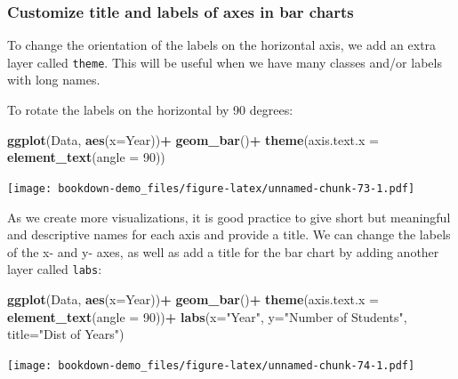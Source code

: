 \documentclass[
]{book}
\newenvironment{Shaded}{\begin{snugshade}}{\end{snugshade}}
\newcommand{\AttributeTok}[1]{\textcolor[rgb]{0.13,0.29,0.53}{#1}}
\newcommand{\DecValTok}[1]{\textcolor[rgb]{0.00,0.00,0.81}{#1}}
\newcommand{\FunctionTok}[1]{\textcolor[rgb]{0.13,0.29,0.53}{\textbf{#1}}}
\newcommand{\NormalTok}[1]{#1}
\newcommand{\SpecialCharTok}[1]{\textcolor[rgb]{0.81,0.36,0.00}{\textbf{#1}}}
\newcommand{\StringTok}[1]{\textcolor[rgb]{0.31,0.60,0.02}{#1}}
\begin{document}
\hypertarget{customize-title-and-labels-of-axes-in-bar-charts}{%
\subsubsection{Customize title and labels of axes in bar charts}\label{customize-title-and-labels-of-axes-in-bar-charts}}

To change the orientation of the labels on the horizontal axis, we add an extra layer called \texttt{theme}. This will be useful when we have many classes and/or labels with long names.

To rotate the labels on the horizontal by 90 degrees:

\begin{Shaded}
\begin{Highlighting}[]
\FunctionTok{ggplot}\NormalTok{(Data, }\FunctionTok{aes}\NormalTok{(}\AttributeTok{x=}\NormalTok{Year))}\SpecialCharTok{+}
  \FunctionTok{geom\_bar}\NormalTok{()}\SpecialCharTok{+}
  \FunctionTok{theme}\NormalTok{(}\AttributeTok{axis.text.x =} \FunctionTok{element\_text}\NormalTok{(}\AttributeTok{angle =} \DecValTok{90}\NormalTok{))}
\end{Highlighting}
\end{Shaded}

\texttt{[image: bookdown-demo\_files/figure-latex/unnamed-chunk-73-1.pdf]}

As we create more visualizations, it is good practice to give short but meaningful and descriptive names for each axis and provide a title. We can change the labels of the x- and y- axes, as well as add a title for the bar chart by adding another layer called \texttt{labs}:

\begin{Shaded}
\begin{Highlighting}[]
\FunctionTok{ggplot}\NormalTok{(Data, }\FunctionTok{aes}\NormalTok{(}\AttributeTok{x=}\NormalTok{Year))}\SpecialCharTok{+}
  \FunctionTok{geom\_bar}\NormalTok{()}\SpecialCharTok{+}
  \FunctionTok{theme}\NormalTok{(}\AttributeTok{axis.text.x =} \FunctionTok{element\_text}\NormalTok{(}\AttributeTok{angle =} \DecValTok{90}\NormalTok{))}\SpecialCharTok{+}
  \FunctionTok{labs}\NormalTok{(}\AttributeTok{x=}\StringTok{"Year"}\NormalTok{, }\AttributeTok{y=}\StringTok{"Number of Students"}\NormalTok{, }\AttributeTok{title=}\StringTok{"Dist of Years"}\NormalTok{)}
\end{Highlighting}
\end{Shaded}

\texttt{[image: bookdown-demo\_files/figure-latex/unnamed-chunk-74-1.pdf]}
\end{document}
